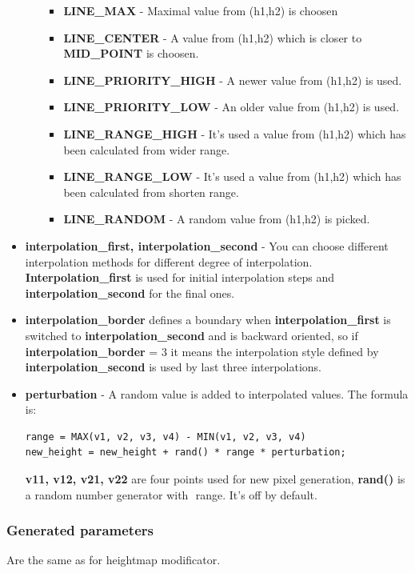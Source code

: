 \documentclass[9pt]{article}
\begin{document}
\begin{itemize}
\begin{itemize}
\begin{itemize}
\item{\bf LINE\_MAX} - Maximal value from (h1,h2) is choosen
\item{\bf LINE\_CENTER} - A value from (h1,h2) which is closer to {\bf MID\_POINT} is choosen.
\item{\bf LINE\_PRIORITY\_HIGH} - A newer value from (h1,h2) is used.
\item{\bf LINE\_PRIORITY\_LOW} - An older value from (h1,h2) is used.
\item{\bf LINE\_RANGE\_HIGH} - It's used a value from (h1,h2) which has been calculated
from wider range.
\item{\bf LINE\_RANGE\_LOW} - It's used a value from (h1,h2) which has been calculated
from shorten range.
\item{\bf LINE\_RANDOM} - A random value from (h1,h2) is picked.
\end{itemize}
\end{itemize}
\item{\bf interpolation\_first, interpolation\_second}
- You can choose different interpolation methods for different degree of interpolation. 
{\bf Interpolation\_first} is used for initial interpolation steps and 
{\bf interpolation\_second} for the final ones. 
\item{\bf interpolation\_border}
defines a boundary when {\bf interpolation\_first} is switched to {\bf interpolation\_second} 
and is backward oriented, so if {\bf interpolation\_border} = 3 it means the interpolation
style defined by {\bf interpolation\_second} is used by last three interpolations.
\item{\bf perturbation} - A random value is added to interpolated values. The formula is:
\begin{verbatim}
range = MAX(v1, v2, v3, v4) - MIN(v1, v2, v3, v4)
new_height = new_height + rand() * range * perturbation;
\end{verbatim}
{\bf v11, v12, v21, v22} are four points used for new pixel generation, 
{\bf rand()} is a random number generator with \begin{math}<-1,1>\end{math} range.
It's off by default.
\end{itemize}

\subsubsection*{Generated parameters}

Are the same as for heightmap modificator.
\end{document}
